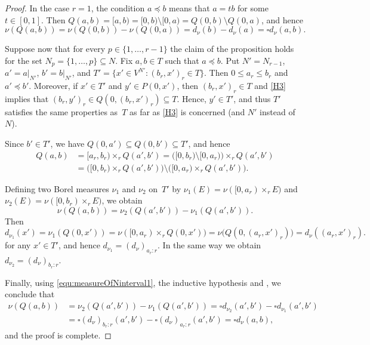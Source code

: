 \documentclass{amsart}
\theoremstyle{plain}%
\theoremstyle{definition}
\theoremstyle{remark}
\begin{document}
\begin{proof}
In the case $r=1$, the condition $a\preceq b$ means that $a=tb$ for some $t\in[0,1]$. Then $Q(a,b)=[a,b)=[0,b)\setminus [0,a)=Q(0,b)\setminus Q(0,a)$, and hence 
\begin{equation*}
\nu(Q(a,b))=\nu(Q(0,b))-\nu(Q(0,a))=d_\nu(b)-d_\nu(a)=\square d_\nu(a,b).
\end{equation*}

Suppose now that for every $p\in\{1,\ldots,r-1\}$ the claim of the proposition holds for the set $N_p=\{1,\ldots,p\}\subseteq N$. Fix $a,b\in T$ such that $a\preceq b$. Put $N'=N_{r-1}$, $a'=a|_{N'}$, $b'=b|_{N'}$, and $T'=\{x'\in V^{N'}:(b_r,x')_r\in T\}$. Then $0\le a_r\le b_r$ and $a'\preceq b'$. Moreover, if $x'\in T'$ and $y'\in P(0,x')$, then $(b_r,x')_r\in T$ and \cref{H3} implies that $(b_r,y')_r\in Q(0,(b_r,x')_r)\subseteq T$. Hence, $y'\in T'$, and thus $T'$ satisfies the same properties as~$T$ as far as \cref{H3} is concerned (and $N'$ instead of~$N$).

Since $b'\in T'$, we have $Q(0,a')\subseteq Q(0,b')\subseteq T'$, and hence
\begin{align*}
Q(a,b)&=[a_r,b_r)\times_r Q(a',b')=\big([0,b_r)\setminus[0,a_r)\big)\times_r Q(a',b')\\	 
&=\big([0,b_r)\times_r Q(a',b')\big)\setminus\big([0,a_r)\times_r Q(a',b')\big).
\end{align*}

Defining two Borel measures $\nu_1$ and $\nu_2$ on~$T'$ by
$\nu_1(E)=\nu([0,a_r)\times_r E)$ and $\nu_2(E)=\nu([0,b_r)\times_r E\big)$, we obtain
\begin{equation}\label{equ:measureOfNinterval1}
\nu(Q(a,b))=\nu_2(Q(a',b'))-\nu_1(Q(a',b')).
\end{equation}
Then 
\begin{equation*}
d_{\nu_1}(x')=\nu_1(Q(0,x'))=\nu([0,a_r)\times_r Q(0,x'))
=\nu\big(Q(0,(a_r,x')_r)\big)=d_\nu((a_r,x')_r).
\end{equation*}
for any $x'\in T'$, and hence $d_{\nu_1}=(d_{\nu})_{a_r{:}r}$. In the same way we obtain $d_{\nu_2}=(d_{\nu})_{b_r{:}r}$. 

Finally, using \eqref{equ:measureOfNinterval1}, the inductive hypothesis and , we conclude that 
\begin{align*}
\nu(Q(a,b))&=\nu_2(Q(a',b'))-\nu_1(Q(a',b'))
=\square d_{\nu_2} (a',b')-\square d_{\nu_1} (a',b')\\
&=\square (d_{\nu})_{b_r{:}r}(a',b')-\square (d_{\nu})_{a_r{:}r}(a',b')
=\square d_{\nu}(a,b),
\end{align*}
and the proof is complete.
\end{proof}
\end{document}
